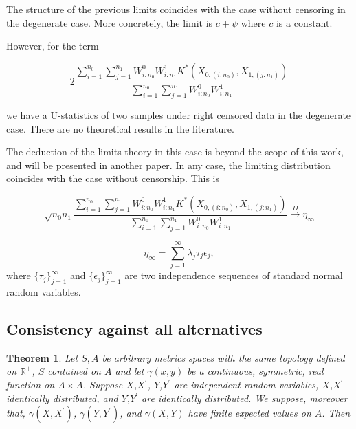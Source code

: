 \documentclass[11pt]{article}
\newtheorem{theorem}{Theorem}
\begin{document}
\begin{appendices}
The structure of the previous limits coincides with the case without censoring  in the degenerate case. More concretely, the limit is $c+\psi$ \cite{korolyuk2013theory} where $c$ is a constant.



 However, for the term


$$2\frac{\sum_{i=1}^{n_0}  \sum_{j=1}^{n_1} W^{0}_{i:n_0} W^{1}_{i:n_1} K^{*}(X_{0,(i:n_0)},X_{1,(j:n_1)})}{\sum_{i=1}^{n_0}  \sum_{j=1}^{n_1} W^{0}_{i:n_0} W^{1}_{i:n_1}}$$

we have a U-statistics of two samples under right censored data in the degenerate case. There are no  theoretical results in the literature. 









The deduction of the limits theory in this case is beyond the scope of this work, and will be presented in another paper. In any case, the limiting distribution coincides with the case without censorship. This is 



$$ \sqrt{n_0n_1}  \frac{\sum_{i=1}^{n_0}  \sum_{j=1}^{n_1} W^{0}_{i:n_0} W^{1}_{i:n_1} K^{*}(X_{0,(i:n_0)},X_{1,(j:n_1)})}{\sum_{i=1}^{n_0}  \sum_{j=1}^{n_1} W^{0}_{i:n_0} W^{1}_{i:n_1}} \overset{D}{\to} \eta_{\infty}$$

$$\eta_{\infty}=\sum_{j=1}^{\infty} \lambda_j \tau_j \epsilon_j,$$
where $\{\tau_j\}^{\infty}_{j=1}$ and $\{\epsilon_j\}^{\infty}_{j=1}$ are two independence sequences of standard normal random variables.




\subsection{Consistency against all alternatives}

\begin{theorem}\label{positivo}
	Let $S,A$ be  arbitrary metrics spaces with the same topology defined on $\mathbb{R^{+}}$, $S$ contained on $A$ and let $\gamma(x,y)$ be a continuous, symmetric, real function on  $A\times A$. Suppose $X$,$X^{\prime}$, $Y$,$Y^{\prime}$ are independent random variables, $X$,$X^{\prime}$ identically distributed, and $Y$,$Y^{\prime}$ are identically distributed. We suppose, moreover that,
	$\gamma(X,X^{\prime})$, $\gamma(Y,Y^{\prime})$, and $\gamma(X,Y)$ have finite expected values on $A$. Then
	

\end{theorem}
\end{appendices}
\end{document}
